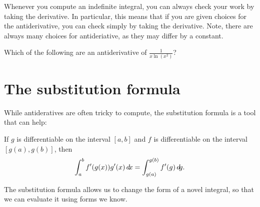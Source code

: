 \documentclass{ximera}
\begin{document}
Whenever you compute an indefinite integral, you can always check your
work by taking the derivative. In particular, this means that if you
are given choices for the antiderivative, you can check simply by
taking the derivative. Note, there are always many choices for
antideriative, as they may differ by a constant.

\begin{question}
  Which of the following are an antiderivative of $\frac{1}{x\ln(x^2)}$?
  \begin{selectAll}
  \end{selectAll}
\end{question}

\section{The substitution formula}

While antideratives are often tricky to compute, the substitution
formula is a tool that can help:

\begin{theorem} 
If $g$ is differentiable on the interval $[a,b]$ and $f$ is
differentiable on the interval $[g(a),g(b)]$, then
\[
\int_a^b f'(g(x)) g'(x) \mathop{}\!d\! x =\int_{g(a)}^{g(b)} f'(g) \mathop{}\!d\! g.
\]
\end{theorem}

The substitution formula allows us to change the form of a novel
integral, so that we can evaluate it using forms we know.
\end{document}
